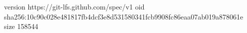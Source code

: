 version https://git-lfs.github.com/spec/v1
oid sha256:10c90c028e481817fb4dcf3e8d531580341fcb9908fc86eaa07ab019a878061e
size 158544
